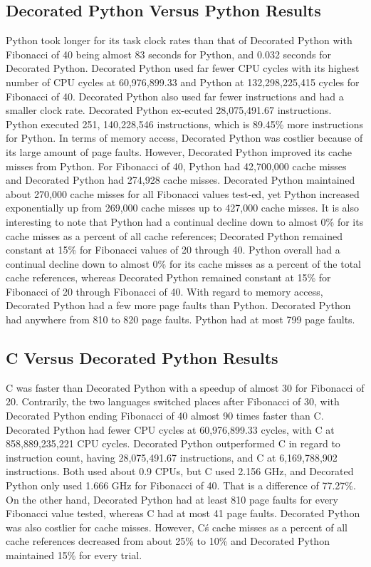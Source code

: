 \documentclass{sig-alternate}
\begin{document}
\subsection{Decorated Python Versus Python Results}
Python took longer for its task clock rates than that of Decorated Python with Fibonacci of 40 being almost 83 seconds for Python, and 0.032 seconds for Decorated Python. Decorated Python used far fewer CPU cycles with its highest number of CPU cycles at 60,976,899.33 and Python at 132,298,225,415 cycles for Fibonacci of 40. Decorated Python also used far fewer instructions and had a smaller clock rate. Decorated Python ex-ecuted 28,075,491.67 instructions. Python executed 251,
140,228,546 instructions, which is 89.45\% more instructions for Python. In terms of memory access, Decorated Python was costlier because of its large amount of page faults. However, Decorated Python improved its cache misses from Python. For Fibonacci of 40, Python had 42,700,000 cache misses and Decorated Python had 274,928 cache misses. Decorated Python maintained about 270,000 cache misses for all Fibonacci values test-ed, yet Python increased exponentially up from 269,000 cache misses up to 427,000 cache misses. It is also interesting to note that Python had a continual decline down to almost 0\% for its cache misses as a percent of all cache references; Decorated Python remained constant at 15\% for Fibonacci values of 20 through 40. Python overall had a continual decline down to almost 0\% for its cache misses as a percent of the total cache references, whereas Decorated Python remained constant at 15\% for Fibonacci of 20 through Fibonacci of 40. With regard to memory access, Decorated Python had a few more page faults than Python. Decorated Python had anywhere from 810 to 820 page faults. Python had at most 799 page faults.

\subsection{C Versus Decorated Python Results}
C was faster than Decorated Python with a speedup of almost 30 for Fibonacci of 20. Contrarily, the two languages switched places after Fibonacci of 30, with Decorated Python ending Fibonacci of 40 almost 90 times faster than C. Decorated Python had fewer CPU cycles at 60,976,899.33 cycles, with C at 858,889,235,221 CPU cycles. Decorated Python outperformed C in regard to instruction count, having 28,075,491.67 instructions, and C at 6,169,788,902 instructions. Both used about 0.9 CPUs, but C used 2.156 GHz, and Decorated Python only used 1.666 GHz for Fibonacci of 40. That is a difference of 77.27\%. On the other hand, Decorated Python had at least 810 page faults for every Fibonacci value tested, whereas C had at most 41 page faults. Decorated Python was also costlier for cache misses. However, C\'s cache misses as a percent of all cache references decreased from about 25\% to 10\% and Decorated Python maintained 15\% for every trial.
\end{document}
